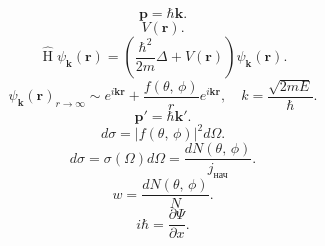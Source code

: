 \documentclass[a4paper]{article}
\title{}
\begin{document}
	\maketitle
\[
	\mathbf{p} = \hbar  \mathbf{k}
.\] 
\[
	V(\mathbf{r})
.\] 
\[
	\widehat{\operatorname{H}} \psi_{\mathbf{k}}
	(\mathbf{r})= \left( \frac{\hbar ^2}{ 2m}
	\Delta + V (\mathbf{r})\right) 
	\psi_\mathbf{k}(\mathbf{r})
.\] 
\[
	\psi_\mathbf{k}(\mathbf{r})_{r \to \infty}
	\sim  e^{i \mathbf{k} \mathbf{r}}
	+ \frac{f(\theta,\,\phi)}{r}
	e^{i \mathbf{k}\mathbf{r}},\quad k= \frac{\sqrt{2mE} }{\hbar }
.\] 
\[
	\mathbf{p}'= \hbar \mathbf{k}'
.\] 
\[
	d\sigma = |f(\theta,\,\phi)|^2 d \Omega
.\] 
\[
	d\sigma= \sigma(\Omega) d\Omega=
	\frac{dN(\theta,\,\phi)}{j_\text{нач}}
.\] 
\[
	w= \frac{dN(\theta,\,\phi)}{N}
.\] 
\[
i \hbar = \frac{\partial \Psi}{\partial x} 
.\] 
\end{document}
